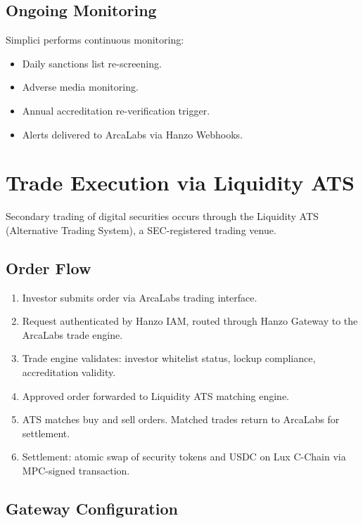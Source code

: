 \documentclass[11pt]{article}
\begin{document}
\subsection{Ongoing Monitoring}

Simplici performs continuous monitoring:
\begin{itemize}[leftmargin=1.4em]
    \item Daily sanctions list re-screening.
    \item Adverse media monitoring.
    \item Annual accreditation re-verification trigger.
    \item Alerts delivered to ArcaLabs via Hanzo Webhooks.
\end{itemize}

\section{Trade Execution via Liquidity ATS}
\label{sec:trade}

Secondary trading of digital securities occurs through the Liquidity
ATS (Alternative Trading System), a SEC-registered trading venue.

\subsection{Order Flow}

\begin{enumerate}[leftmargin=1.4em]
    \item Investor submits order via ArcaLabs trading interface.
    \item Request authenticated by Hanzo IAM, routed through Hanzo
    Gateway to the ArcaLabs trade engine.
    \item Trade engine validates: investor whitelist status, lockup
    compliance, accreditation validity.
    \item Approved order forwarded to Liquidity ATS matching engine.
    \item ATS matches buy and sell orders. Matched trades return to
    ArcaLabs for settlement.
    \item Settlement: atomic swap of security tokens and USDC on Lux
    C-Chain via MPC-signed transaction.
\end{enumerate}

\subsection{Gateway Configuration}
\end{document}
